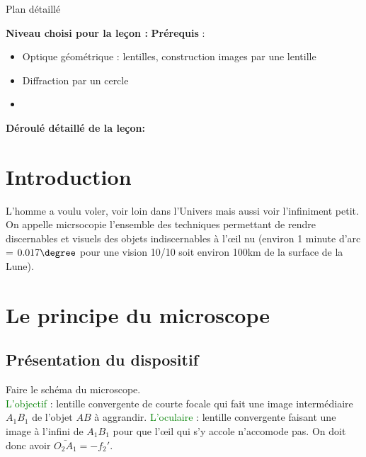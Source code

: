 \begin{reportBlock}{Plan détaillé}

  \textbf{Niveau choisi pour la leçon :} 
  \newline
  \textbf{Prérequis} : \begin{itemize}
      \item Optique géométrique : lentilles, construction images par une lentille
      \item Diffraction par un cercle
      \item 
  \end{itemize}

  \textbf{Déroulé détaillé de la leçon: }  
  
  \section*{Introduction}
  L'homme a voulu voler, voir loin dans l'Univers mais aussi voir l'infiniment petit.\\
  On appelle micrsocopie l'ensemble des techniques permettant de rendre discernables et visuels des objets indiscernables à l'\oe il nu (environ 1 minute d'arc = $0.017\degree$ pour une vision 10/10 soit environ 100km de la surface de la Lune). 

  \section{Le principe du microscope}

  \subsection{Présentation du dispositif}
  Faire le schéma du microscope.\\
  \textcolor{green}{L'objectif} : lentille convergente de courte focale qui fait une image intermédiaire $A_1B_1$ de l'objet $AB$ à aggrandir. \textcolor{green}{L'oculaire} : lentille convergente faisant une image à l'infini de $A_1B_1$ pour que l'\oe il qui s'y accole n'accomode pas. On doit donc avoir $\bar{O_2A_1}=-f_2'$.


\end{reportBlock}
